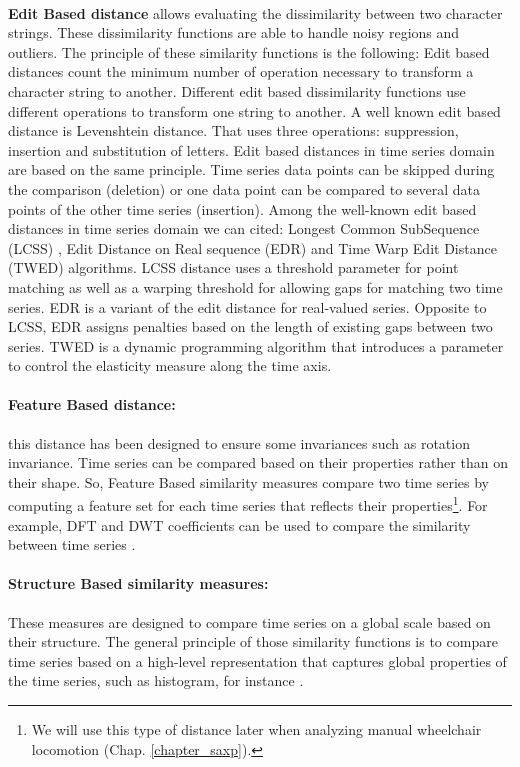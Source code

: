 \paragraph{}\textbf{Edit Based distance} allows evaluating the dissimilarity between two character strings. These dissimilarity functions are able to handle noisy regions and outliers. The principle of these similarity functions is the following: Edit based distances count the minimum number of operation necessary to transform a character string to another. Different edit based dissimilarity functions use different operations to transform one string to another. A well known edit based distance is Levenshtein distance. That uses three operations: suppression, insertion and substitution of letters. Edit based distances in time series domain are based on the same principle. Time series data points can be skipped during the comparison (deletion) or one  data point can be compared to several data points of the other time series (insertion). Among the well-known  edit based distances in time series domain we can cited: Longest Common SubSequence (LCSS) \cite{das1997finding}, Edit Distance on Real sequence (EDR) \cite{chen2005robust} and Time Warp Edit Distance (TWED) \cite{marteau2009time} algorithms. LCSS distance uses a threshold parameter for point matching as well as a warping threshold for allowing gaps for matching two time series. EDR is a variant of the edit distance for real-valued series. Opposite to LCSS, EDR assigns penalties based on the length of existing gaps between two series. TWED is a dynamic programming algorithm that introduces a parameter to control the elasticity measure along the time axis. 

\paragraph{Feature Based distance:} this distance has been designed to ensure some invariances such as rotation invariance. Time series can be compared based on their properties rather than on their shape. So, Feature Based similarity measures compare two time series by computing a feature set for
each time series that reflects their properties\footnote{We will use this type of distance later when analyzing manual wheelchair locomotion (Chap. \ref{chapter_saxp}).}. For example, DFT and DWT coefficients can be used to compare the similarity between time series \cite{shatkay1996approximate}.


\paragraph{Structure Based similarity measures:}These measures are designed to compare time series on a global scale based on their structure. The general principle of those similarity functions is to compare time series based on a high-level representation that captures global properties of the time series, such as histogram, for instance  \cite{lin2009finding}.   



